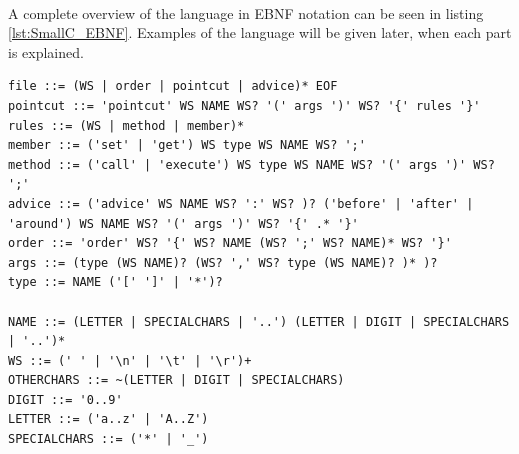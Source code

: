 \documentclass[a4paper]{report}
\begin{document}
\\
A complete overview of the language in EBNF notation can be seen in listing \ref{lst:SmallC_EBNF}. Examples of the language will be given later, when each part is explained.\\
\begin{minipage}{\linewidth}
\begin{lstlisting}[caption=EBNF notation of the aspect langauge., label=lst:SmallC_EBNF]
file ::= (WS | order | pointcut | advice)* EOF
pointcut ::= 'pointcut' WS NAME WS? '(' args ')' WS? '{' rules '}'
rules ::= (WS | method | member)*
member ::= ('set' | 'get') WS type WS NAME WS? ';'
method ::= ('call' | 'execute') WS type WS NAME WS? '(' args ')' WS? ';'
advice ::= ('advice' WS NAME WS? ':' WS? )? ('before' | 'after' | 'around') WS NAME WS? '(' args ')' WS? '{' .* '}' 
order ::= 'order' WS? '{' WS? NAME (WS? ';' WS? NAME)* WS? '}' 
args ::= (type (WS NAME)? (WS? ',' WS? type (WS NAME)? )* )?
type ::= NAME ('[' ']' | '*')?

NAME ::= (LETTER | SPECIALCHARS | '..') (LETTER | DIGIT | SPECIALCHARS | '..')* 
WS ::= (' ' | '\n' | '\t' | '\r')+
OTHERCHARS ::= ~(LETTER | DIGIT | SPECIALCHARS)
DIGIT ::= '0..9'
LETTER ::= ('a..z' | 'A..Z')
SPECIALCHARS ::= ('*' | '_')
\end{lstlisting}
\end{minipage}
\end{document}
